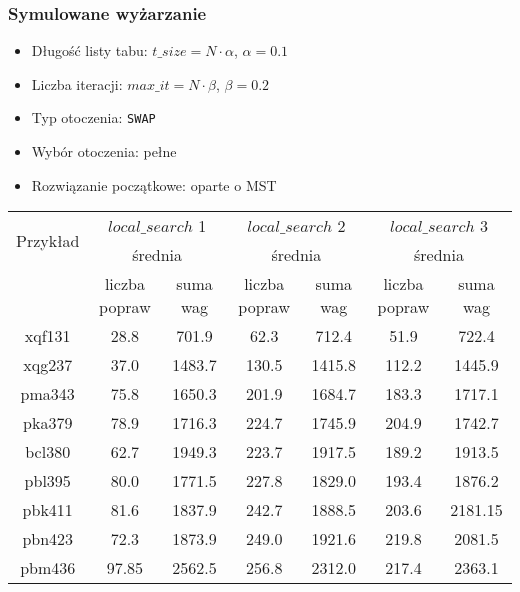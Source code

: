 \documentclass{article}
\begin{document}
\subsubsection*{Symulowane wyżarzanie}
	\begin{itemize}
		\item Długość listy tabu: $t\_size = N \cdot \alpha$, $ \alpha = 0.1$
		\item Liczba iteracji: $max\_it = N \cdot \beta$, $\beta = 0.2$
		\item Typ otoczenia: \texttt{SWAP}
		\item Wybór otoczenia: pełne
		\item Rozwiązanie początkowe: oparte o MST
	\end{itemize}

\begin{table}[h!]
    \centering
    \begin{tabular}{|c|c|c|c|c|c|c|}
        \hline
        \multirow{2}{*}{Przykład} & \multicolumn{2}{|c|}{$local\_search$ 1} & \multicolumn{2}{|c|}{$local\_search$ 2}  & \multicolumn{2}{|c|}{$local\_search$ 3}  \\
        \cline{2-7}
        & \multicolumn{2}{c|}{średnia} & \multicolumn{2}{c|}{średnia} & \multicolumn{2}{c|}{średnia} \\
        \cline{2-4} \cline{4-5} \cline{6-7}
        & liczba popraw & suma wag & liczba popraw & suma wag & liczba popraw & suma wag \\
        \hline
        xqf131 & 28.8 & 701.9 & 62.3 & 712.4 & 51.9 & 722.4 \\
        \hline
        xqg237 & 37.0 & 1483.7 & 130.5 & 1415.8 & 112.2 & 1445.9 \\
        \hline
        pma343 & 75.8 & 1650.3 & 201.9 & 1684.7 & 183.3 & 1717.1 \\
        \hline
        pka379 & 78.9 & 1716.3 & 224.7 & 1745.9 & 204.9 & 1742.7 \\
        \hline
        bcl380 & 62.7 & 1949.3 & 223.7 & 1917.5 & 189.2 & 1913.5 \\
        \hline
        pbl395 & 80.0 & 1771.5 & 227.8 & 1829.0 & 193.4 & 1876.2 \\
        \hline
        pbk411 & 81.6 & 1837.9 & 242.7 & 1888.5 & 203.6 & 2181.15 \\
        \hline
        pbn423 & 72.3 & 1873.9 & 249.0 & 1921.6 & 219.8 & 2081.5 \\
        \hline
        pbm436 & 97.85 & 2562.5 & 256.8 & 2312.0 & 217.4 & 2363.1 \\

\end{tabular}
\end{table}
\end{document}
